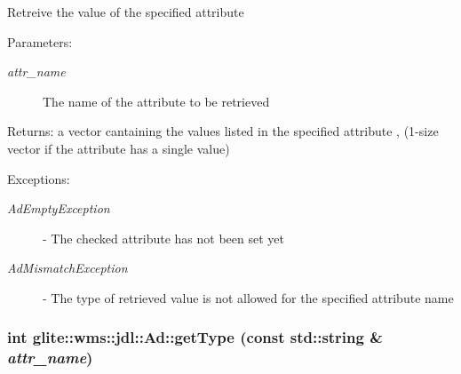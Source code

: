 Retreive the value of the specified attribute \begin{Desc}
\item[Parameters:]
\begin{description}
\item[{\em attr\_\-name}]The name of the attribute to be retrieved \end{description}
\end{Desc}
\begin{Desc}
\item[Returns:]a vector cantaining the values listed in the specified attribute , (1-size vector if the attribute has a single value) \end{Desc}
\begin{Desc}
\item[Exceptions:]
\begin{description}
\item[{\em Ad\-Empty\-Exception}]- The checked attribute has not been set yet \item[{\em Ad\-Mismatch\-Exception}]- The type of retrieved value is not allowed for the specified attribute name \end{description}
\end{Desc}
\hypertarget{classglite_1_1wms_1_1jdl_1_1Ad_z19_1}{
\subsubsection[getType]{\setlength{\rightskip}{0pt plus 5cm}int glite::wms::jdl::Ad::get\-Type (const std::string \& {\em attr\_\-name})}}
\label{classglite_1_1wms_1_1jdl_1_1Ad_z19_1}


